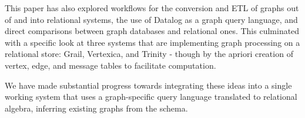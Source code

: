 \documentclass[11pt,letterpaper]{article}
\begin{document}
This paper has also explored workflows for the conversion and ETL of graphs out of and into relational systems, the use of Datalog as a graph query language, and direct comparisons between graph databases and relational ones. This culminated with a specific look at three systems that are implementing graph processing on a relational store: Grail, Vertexica, and Trinity - though by the apriori creation of vertex, edge, and message tables to facilitate computation.

We have made substantial progress towards integrating these ideas into a single working system that uses a graph-specific query language translated to relational algebra, inferring existing graphs from the schema.




%
%
%
%
%
%
%
%
\end{document}
